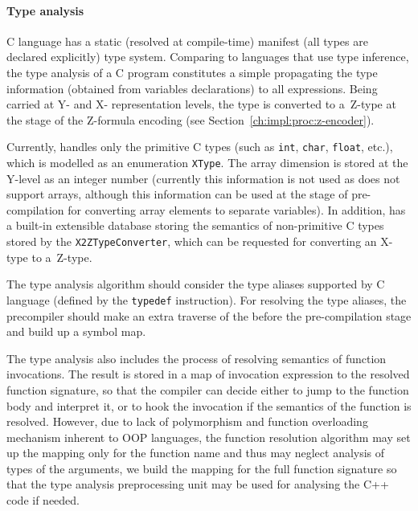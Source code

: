 \paragraph{Type analysis}
\label{ch:impl:proc:x-pre-compiler:type}

C language has a static (resolved at compile-time) manifest (all types are declared explicitly) type system.
Comparing to languages that use type inference, the type analysis of a C program constitutes a simple propagating the type information (obtained from variables declarations) to all expressions. %
Being carried at Y- and X- representation levels, the type is converted to a~Z-type at the stage of the Z-formula encoding (see Section~\ref{ch:impl:proc:z-encoder}).

Currently, \porthos[2] handles only the primitive C types (such as \texttt{int}, \texttt{char}, \texttt{float}, etc.), which is modelled as an enumeration \texttt{XType}. %
The array dimension is stored at the Y-level as an integer number (currently this information is not used as \porthos[2] does not support arrays, although this information can be used at the stage of pre-compilation for converting array elements to separate variables). %
In addition, \porthos[2] has a built-in extensible database storing the semantics of non-primitive C types stored by the \texttt{X2ZTypeConverter}, %
which can be requested for converting an X-type to a~Z-type. %

The type analysis algorithm should consider the type aliases supported by C language (defined by the \texttt{typedef} instruction).
For resolving the type aliases, the precompiler should make an extra traverse of the \ytree{} before the pre-compilation stage and build up a symbol map.

The type analysis also includes the process of resolving semantics of function invocations.
The result is stored in a map of invocation expression to the resolved function signature, so that the compiler can decide either to jump to the function body and interpret it, or to hook the invocation if the semantics of the function is resolved.
However, due to lack of polymorphism and function overloading mechanism inherent to OOP languages, the function resolution algorithm may set up the mapping only for the function name and thus may neglect analysis of types of the arguments, we build the mapping for the full function signature so that the type analysis preprocessing unit may be used for analysing the C++ code if needed.

